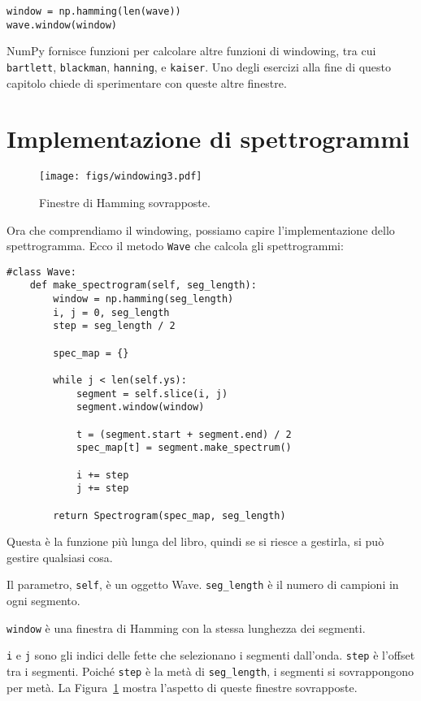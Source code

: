 \documentclass[12pt]{book} \usepackage[width=5.5in,height=8.5in, hmarginratio=3:2,vmarginratio=1:1]{geometry}
\begin{document}
\begin{verbatim} 
window = np.hamming(len(wave))
wave.window(window)
 \end{verbatim} 

NumPy fornisce funzioni per calcolare altre funzioni di windowing, tra cui {\tt bartlett}, {\tt blackman}, {\tt hanning}, e {\tt kaiser}. Uno degli esercizi alla fine di questo capitolo chiede di sperimentare con queste altre finestre.

\section{Implementazione di spettrogrammi} 

\begin{figure} 

\centerline{\texttt{[image: figs/windowing3.pdf]}} \caption{Finestre di Hamming sovrapposte.} \label{fig.windowing3} \end{figure} 

Ora che comprendiamo il windowing, possiamo capire l'implementazione dello spettrogramma. Ecco il metodo {\tt Wave} che calcola gli spettrogrammi:

\begin{verbatim} 
#class Wave:
    def make_spectrogram(self, seg_length):
        window = np.hamming(seg_length)
        i, j = 0, seg_length
        step = seg_length / 2

        spec_map = {}

        while j < len(self.ys):
            segment = self.slice(i, j)
            segment.window(window)

            t = (segment.start + segment.end) / 2
            spec_map[t] = segment.make_spectrum()

            i += step
            j += step

        return Spectrogram(spec_map, seg_length)
 \end{verbatim} 

Questa è la funzione più lunga del libro, quindi se si riesce a gestirla, si può gestire qualsiasi cosa.

Il parametro, {\tt self}, è un oggetto Wave. \verb"seg_length" è il numero di campioni in ogni segmento.

{\tt window} è una finestra di Hamming con la stessa lunghezza dei segmenti.

{\tt i} e {\tt j} sono gli indici delle fette che selezionano i segmenti dall'onda. {\tt step} è l'offset tra i segmenti. Poiché {\tt step} è la metà di \verb"seg_length", i segmenti si sovrappongono per metà. La Figura~\ref{fig.windowing3} mostra l'aspetto di queste finestre sovrapposte.
\end{document}
